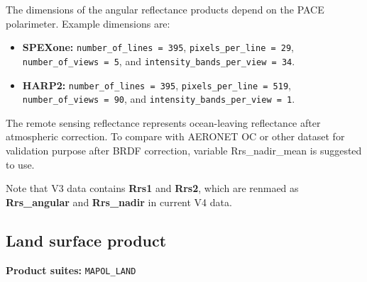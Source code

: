 \documentclass[
  11pt,
  letterpaper,
]{scrreprt}
\providecommand{\tightlist}{%
  \setlength{\itemsep}{0pt}\setlength{\parskip}{0pt}}
\begin{document}
The dimensions of the angular reflectance products depend on the PACE
polarimeter. Example dimensions are:

\begin{itemize}
\tightlist
\item
  \textbf{SPEXone:} \texttt{number\_of\_lines\ =\ 395},
  \texttt{pixels\_per\_line\ =\ 29}, \texttt{number\_of\_views\ =\ 5},
  and \texttt{intensity\_bands\_per\_view\ =\ 34}.
\item
  \textbf{HARP2:} \texttt{number\_of\_lines\ =\ 395},
  \texttt{pixels\_per\_line\ =\ 519}, \texttt{number\_of\_views\ =\ 90},
  and \texttt{intensity\_bands\_per\_view\ =\ 1}.
\end{itemize}

The remote sensing reflectance represents ocean-leaving reflectance
after atmospheric correction. To compare with AERONET OC or other
dataset for validation purpose after BRDF correction, variable
Rrs\_nadir\_mean is suggested to use.

Note that V3 data contains \textbf{Rrs1} and \textbf{Rrs2}, which are
renmaed as \textbf{Rrs\_angular} and \textbf{Rrs\_nadir} in current V4
data.

\subsection{Land surface product}\label{land-surface-product}

\textbf{Product suites:} \texttt{MAPOL\_LAND}
\end{document}
